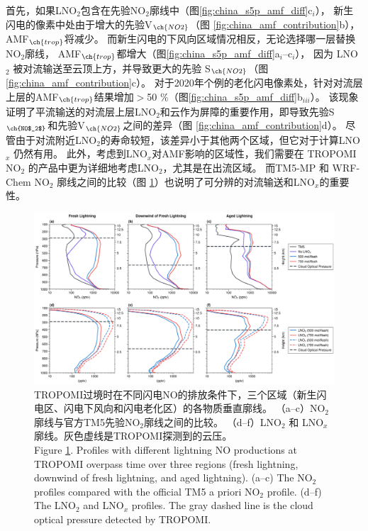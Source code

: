首先，如果LNO$_2$包含在先验NO$_2$廓线中（图\ref{fig:china_s5p_amf_diff}c$_i$），
新生闪电的像素中处由于增大的先验V$_{\ch{NO2}}$（图 \ref{fig:china_amf_contribution}b），AMF$_{\ch{trop}}$将减少。
而新生闪电的下风向区域情况相反，无论选择哪一层替换NO$_2$廓线，
AMF$_{\ch{trop}}$都增大（图\ref{fig:china_s5p_amf_diff}a$_{i}$--c$_{i}$），
因为 LNO $_2$ 被对流输送至云顶上方，并导致更大的先验 S$_{\ch{NO2}}$（图 \ref{fig:china_amf_contribution}c）。
对于2020年个例的老化闪电像素处，针对对流层上层的AMF$_{\ch{trop}}$结果增加$>$50 \%（图\ref{fig:china_s5p_amf_diff}b$_{iii}$）。
该现象证明了平流输送的对流层上层LNO$_2$和云作为屏障的重要作用，即导致先验S$_{\ch{NO$_2$}}$和先验V$_{\ch{NO2}}$之间的差异（图 \ref{fig:china_amf_contribution}d）。
尽管由于对流附近LNO$_2$的寿命较短，该差异小于其他两个区域，但它对于计算LNO$_x$ 仍然有用。
此外，考虑到LNO$_x$对AMF影响的区域性，我们需要在 TROPOMI NO$_2$ 的产品中更为详细地考虑LNO$_2$，尤其是在出流区域。
而TM5-MP 和 WRF-Chem NO$_2$ 廓线之间的比较（图 \ref{fig:china_nox_profile}）也说明了可分辨的对流输送和LNO$_x$的重要性。


\begin{figure}[H]
    \includegraphics[width=16cm]{./figures/china_nox_profile.png}
    \caption{
    TROPOMI过境时在不同闪电NO的排放条件下，三个区域（新生闪电区、闪电下风向和闪电老化区）的各物质垂直廓线。
    （a--c）NO$_2$廓线与官方TM5先验NO$_2$廓线之间的比较。
    （d--f）LNO$_2$ 和 LNO$_x$廓线。灰色虚线是TROPOMI探测到的云压。\\
     Figure \ref{fig:china_nox_profile}. Profiles with different lightning NO productions at TROPOMI overpass time over three regions (fresh lightning, downwind of fresh lightning, and aged lightning).
    (a--c) The NO$_2$ profiles compared with the official TM5 a priori NO$_2$ profile.
    (d--f) The LNO$_2$ and LNO$_x$ profiles.
    The gray dashed line is the cloud optical pressure detected by TROPOMI.
    }
    \label{fig:china_nox_profile}
\end{figure}


